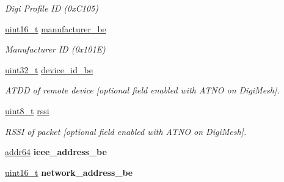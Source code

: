 \begin{DoxyCompactItemize}
\begin{DoxyCompactList}\small\item\em Digi Profile I\-D (0x\-C105) \end{DoxyCompactList}\item 
\hypertarget{group__xbee__discovery_ga35abb56c1328cf62dfa8e54bc700ed19}{\hyperlink{group__hal_ga5a8b2dc9e45a9ee81a94ef304fb62505}{uint16\-\_\-t} \hyperlink{group__xbee__discovery_ga35abb56c1328cf62dfa8e54bc700ed19}{manufacturer\-\_\-be}}\label{group__xbee__discovery_ga35abb56c1328cf62dfa8e54bc700ed19}

\begin{DoxyCompactList}\small\item\em Manufacturer I\-D (0x101\-E) \end{DoxyCompactList}\item 
\hypertarget{group__xbee__discovery_ga7c278740875f8ad1696c446db22e3407}{\hyperlink{group__hal__dos_ga09a1e304d66d35dd47daffee9731edaa}{uint32\-\_\-t} \hyperlink{group__xbee__discovery_ga7c278740875f8ad1696c446db22e3407}{device\-\_\-id\-\_\-be}}\label{group__xbee__discovery_ga7c278740875f8ad1696c446db22e3407}

\begin{DoxyCompactList}\small\item\em A\-T\-D\-D of remote device \mbox{[}optional field enabled with A\-T\-N\-O on Digi\-Mesh\mbox{]}. \end{DoxyCompactList}\item 
\hypertarget{group__xbee__discovery_gafb67d818cd76cce8057affabcb1979a6}{\hyperlink{group__hal_gae1affc9ca37cfb624959c866a73f83c2}{uint8\-\_\-t} \hyperlink{group__xbee__discovery_gafb67d818cd76cce8057affabcb1979a6}{rssi}}\label{group__xbee__discovery_gafb67d818cd76cce8057affabcb1979a6}

\begin{DoxyCompactList}\small\item\em R\-S\-S\-I of packet \mbox{[}optional field enabled with A\-T\-N\-O on Digi\-Mesh\mbox{]}. \end{DoxyCompactList}\item 
\hypertarget{group__xbee__discovery_ga231e348f98931de7fde1d09f64264afc}{\hyperlink{unionaddr64}{addr64} {\bfseries ieee\-\_\-address\-\_\-be}}\label{group__xbee__discovery_ga231e348f98931de7fde1d09f64264afc}

\item 
\hypertarget{group__xbee__discovery_ga73d48563eb05cd5fcc4add79d226a3b8}{\hyperlink{group__hal_ga5a8b2dc9e45a9ee81a94ef304fb62505}{uint16\-\_\-t} {\bfseries network\-\_\-address\-\_\-be}}\label{group__xbee__discovery_ga73d48563eb05cd5fcc4add79d226a3b8}


\end{DoxyCompactItemize}
